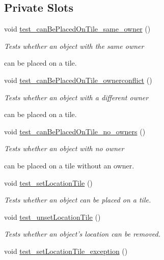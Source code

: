 \subsection*{Private Slots}
\begin{DoxyCompactItemize}
\item 
void \hyperlink{classdefault__worker_ad24b13f13fa8c36339c7a7cef535d8b9}{test\-\_\-can\-Be\-Placed\-On\-Tile\-\_\-same\-\_\-owner} ()
\begin{DoxyCompactList}\small\item\em Tests whether an object with the same owner \par
 can be placed on a tile. \end{DoxyCompactList}\item 
void \hyperlink{classdefault__worker_a0e5d2687739d821e3f6beaa7c4e65cd9}{test\-\_\-can\-Be\-Placed\-On\-Tile\-\_\-ownerconflict} ()
\begin{DoxyCompactList}\small\item\em Tests whether an object with a different owner \par
 can be placed on a tile. \end{DoxyCompactList}\item 
void \hyperlink{classdefault__worker_a7858f59a97e1747ee452f34ffe4703ca}{test\-\_\-can\-Be\-Placed\-On\-Tile\-\_\-no\-\_\-owners} ()
\begin{DoxyCompactList}\small\item\em Tests whether an object with no owner \par
 can be placed on a tile without an owner. \end{DoxyCompactList}\item 
void \hyperlink{classdefault__worker_a2b396d92740880572f56bbab7ad584b4}{test\-\_\-set\-Location\-Tile} ()
\begin{DoxyCompactList}\small\item\em Tests whether an object can be placed on a tile. \end{DoxyCompactList}\item 
void \hyperlink{classdefault__worker_a79930b71a5ed3d6322aaa1123fbec92b}{test\-\_\-unset\-Location\-Tile} ()
\begin{DoxyCompactList}\small\item\em Tests whether an object's location can be removed. \end{DoxyCompactList}\item 
void \hyperlink{classdefault__worker_afc31832f2490e8f4099e6460a5b533ce}{test\-\_\-set\-Location\-Tile\-\_\-exception} ()

\end{DoxyCompactItemize}
